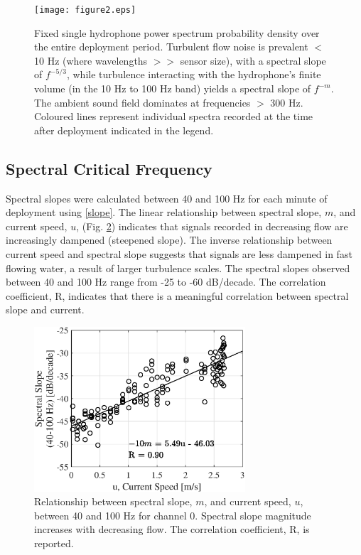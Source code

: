 \documentclass[12pt,journal,onecolumn]{IEEEtran}
\begin{document}
\begin{figure}[!t]
	\begin{center}
		\texttt{[image: figure2.eps]} 
	\end{center}
	\caption[Power spectrum probability density]{
	\label{f:lines}
	Fixed single hydrophone power spectrum probability density over the entire deployment period. Turbulent flow noise is prevalent $<$ 10 Hz (where wavelengths $>>$ sensor size), with a spectral slope of $f^{-5/3}$, while turbulence interacting with the hydrophone's finite volume (in the 10 Hz to 100 Hz band) yields a spectral slope of $f^{-m}$. The ambient sound field dominates at frequencies $>$ 300 Hz. Coloured lines represent individual spectra recorded at the time after deployment indicated in the legend.}
\end{figure}


\subsection{Spectral Critical Frequency}
Spectral slopes were calculated between 40 and 100 Hz for each minute of deployment using \eqref{slope}. The linear relationship between spectral slope, $m$, and current speed, $u$, (Fig. \ref{f:slopes}) indicates that signals recorded in decreasing flow are increasingly dampened (steepened slope). The inverse relationship between current speed and spectral slope suggests that signals are less dampened in fast flowing water, a result of larger turbulence scales. The spectral slopes observed between 40 and 100 Hz range from -25 to -60 dB/decade. The correlation coefficient, R, indicates that there is a meaningful correlation between spectral slope and current.
\begin{figure}[!t]
	\begin{center}
		\includegraphics[width=0.7\textwidth]{figure3.eps} 
	\end{center}%
	\caption[Spectral slope current speed dependence]{
	\label{f:slopes}
	Relationship between spectral slope, $m$, and current speed, $u$, between 40 and 100 Hz for channel 0. Spectral slope magnitude increases with decreasing flow. The correlation coefficient, R, is reported. }
\end{figure}
\end{document}
